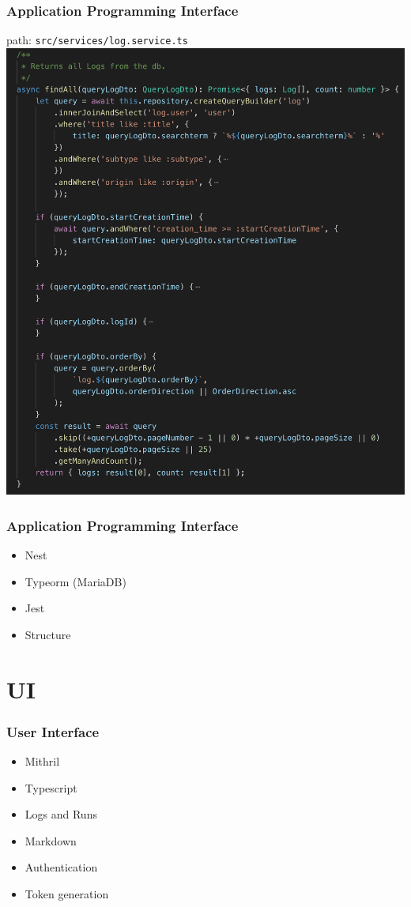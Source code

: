 \documentclass[12pt]{beamer}
\begin{document}
	\begin{frame}
		\frametitle{Application Programming Interface}
		path: \texttt{src/services/log.service.ts}
		\includegraphics[scale=.3]{assets/logs_service.png}
	\end{frame}

    \begin{frame}
        \frametitle{Application Programming Interface}
        \begin{itemize}
        	\item Nest
        	\item Typeorm (MariaDB)
        	\item Jest
        	\item Structure
        \end{itemize}
    \end{frame}

	\section{UI}
	\begin{frame}
		\frametitle{User Interface}
		\begin{itemize}
			\item Mithril
			\item Typescript
			\item Logs and Runs
			\item Markdown
			\item Authentication
			\item Token generation
		\end{itemize}
	\end{frame}
\end{document}
